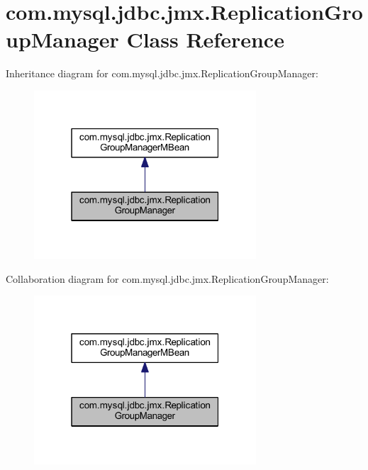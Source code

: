 \hypertarget{classcom_1_1mysql_1_1jdbc_1_1jmx_1_1_replication_group_manager}{}\section{com.\+mysql.\+jdbc.\+jmx.\+Replication\+Group\+Manager Class Reference}
\label{classcom_1_1mysql_1_1jdbc_1_1jmx_1_1_replication_group_manager}


Inheritance diagram for com.\+mysql.\+jdbc.\+jmx.\+Replication\+Group\+Manager\+:
\nopagebreak
\begin{figure}[H]
\begin{center}
\leavevmode
\includegraphics[width=235pt]{classcom_1_1mysql_1_1jdbc_1_1jmx_1_1_replication_group_manager__inherit__graph}
\end{center}
\end{figure}


Collaboration diagram for com.\+mysql.\+jdbc.\+jmx.\+Replication\+Group\+Manager\+:
\nopagebreak
\begin{figure}[H]
\begin{center}
\leavevmode
\includegraphics[width=235pt]{classcom_1_1mysql_1_1jdbc_1_1jmx_1_1_replication_group_manager__coll__graph}
\end{center}
\end{figure}
